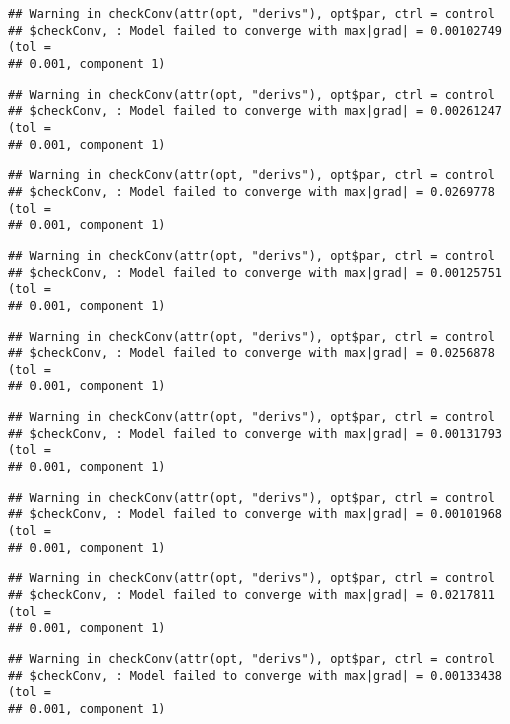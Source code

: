 \documentclass[]{article}
\begin{document}
\begin{verbatim}
## Warning in checkConv(attr(opt, "derivs"), opt$par, ctrl = control
## $checkConv, : Model failed to converge with max|grad| = 0.00102749 (tol =
## 0.001, component 1)
\end{verbatim}

\begin{verbatim}
## Warning in checkConv(attr(opt, "derivs"), opt$par, ctrl = control
## $checkConv, : Model failed to converge with max|grad| = 0.00261247 (tol =
## 0.001, component 1)
\end{verbatim}

\begin{verbatim}
## Warning in checkConv(attr(opt, "derivs"), opt$par, ctrl = control
## $checkConv, : Model failed to converge with max|grad| = 0.0269778 (tol =
## 0.001, component 1)
\end{verbatim}

\begin{verbatim}
## Warning in checkConv(attr(opt, "derivs"), opt$par, ctrl = control
## $checkConv, : Model failed to converge with max|grad| = 0.00125751 (tol =
## 0.001, component 1)
\end{verbatim}

\begin{verbatim}
## Warning in checkConv(attr(opt, "derivs"), opt$par, ctrl = control
## $checkConv, : Model failed to converge with max|grad| = 0.0256878 (tol =
## 0.001, component 1)
\end{verbatim}

\begin{verbatim}
## Warning in checkConv(attr(opt, "derivs"), opt$par, ctrl = control
## $checkConv, : Model failed to converge with max|grad| = 0.00131793 (tol =
## 0.001, component 1)
\end{verbatim}

\begin{verbatim}
## Warning in checkConv(attr(opt, "derivs"), opt$par, ctrl = control
## $checkConv, : Model failed to converge with max|grad| = 0.00101968 (tol =
## 0.001, component 1)
\end{verbatim}

\begin{verbatim}
## Warning in checkConv(attr(opt, "derivs"), opt$par, ctrl = control
## $checkConv, : Model failed to converge with max|grad| = 0.0217811 (tol =
## 0.001, component 1)
\end{verbatim}

\begin{verbatim}
## Warning in checkConv(attr(opt, "derivs"), opt$par, ctrl = control
## $checkConv, : Model failed to converge with max|grad| = 0.00133438 (tol =
## 0.001, component 1)
\end{verbatim}
\end{document}
